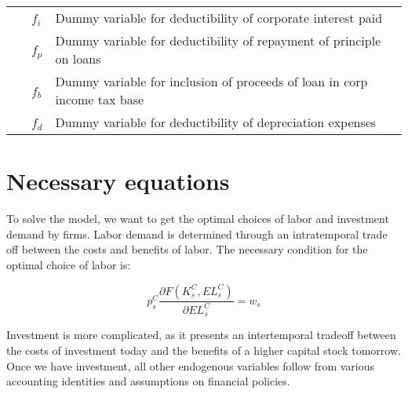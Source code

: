 \begin{table}[htbp]
\begin{tabular}{ll}
    \ \ \ $f_{i}$ & Dummy variable for deductibility of corporate interest paid \\
    \ \ \ $f_{p}$ & Dummy variable for deductibility of repayment of principle on loans \\
    \ \ \ $f_{b}$ & Dummy variable for inclusion of proceeds of loan in corp income tax base \\
    \ \ \ $f_{d}$ & Dummy variable for deductibility of depreciation expenses \\
    \hline
    \hline
    \end{tabular}%
  \label{tab:parameters}%
\end{table}%

\section{Necessary equations}
To solve the model, we want to get the optimal choices of labor and investment demand by firms.  Labor demand is determined through an intratemporal trade off between the costs and benefits of labor.  The necessary condition for the optimal choice of labor is: 

\begin{equation}
\label{eqn:foc_l}
p^{C}_{s}\frac{\partial F(K^{C}_{s},EL^{C}_{s})}{\partial EL^{C}_{s}}=w_{s}
\end{equation}

Investment is more complicated, as it presents an intertemporal tradeoff between the costs of investment today and the benefits of a higher capital stock tomorrow.  Once we have investment, all other endogenous variables follow from various accounting identities and assumptions on financial policies.

